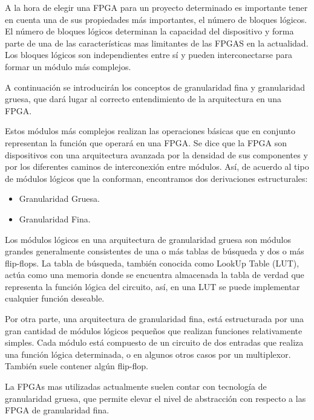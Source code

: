 A la hora de elegir una FPGA para un proyecto determinado es importante tener en cuenta una de sus propiedades más importantes, el número de bloques lógicos. \newline
El número de bloques lógicos determinan la capacidad del dispositivo y forma parte de una de las características mas limitantes de las FPGAS en la actualidad. Los bloques lógicos son independientes entre sí y pueden interconectarse para formar un módulo más complejos. \newline

A continuación se introducirán los conceptos de granularidad fina y granularidad gruesa, que dará lugar al correcto entendimiento de la arquitectura en una FPGA. 

Estos módulos más complejos realizan las operaciones básicas que en conjunto representan la función que operará en una FPGA. Se dice que la FPGA son dispositivos con una arquitectura avanzada por la densidad de sus componentes y por los diferentes caminos de interconexión entre módulos. Así, de acuerdo al tipo de módulos lógicos que la conforman, encontramos dos derivaciones estructurales: 
\begin{itemize}
	\item Granularidad Gruesa.
	\item Granularidad Fina.
\end{itemize}

Los módulos lógicos en una arquitectura de granularidad gruesa son módulos grandes generalmente consistentes de una o más tablas de búsqueda y dos o más flip-flops. La tabla de búsqueda, también conocida como LookUp Table (LUT), actúa como una memoria donde se encuentra almacenada la tabla de verdad que representa la función lógica del circuito, así, en una LUT se puede implementar cualquier función deseable.\newline

Por otra parte, una arquitectura de granularidad fina, está estructurada por una gran cantidad de módulos lógicos pequeños que realizan funciones relativamente simples. Cada módulo está compuesto de un circuito de dos entradas que realiza una función lógica determinada, o en algunos otros casos por un multiplexor. También suele contener algún flip-flop.  \newline

La FPGAs mas utilizadas actualmente suelen contar con tecnología de granularidad gruesa, que permite elevar el nivel de abstracción con respecto a las FPGA de granularidad fina. \newline


